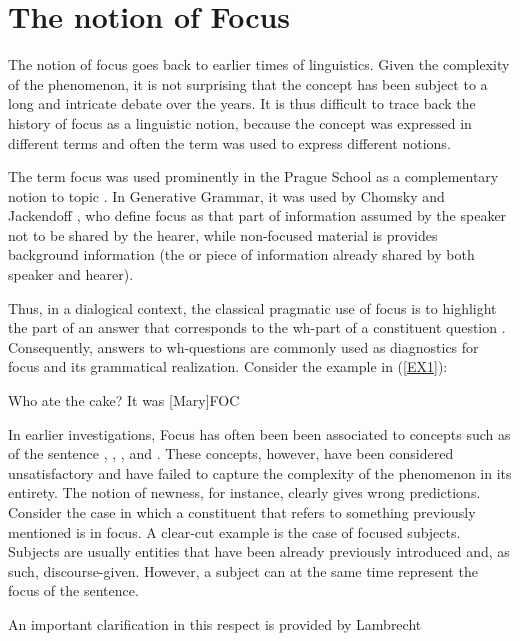 \documentclass[12pt]{report}
\begin{document}
\section{The notion of Focus} \label{notion}

The notion of focus goes back to earlier times of linguistics. Given the complexity of the phenomenon, it is not surprising that the concept has been subject to a long and intricate debate over the years. 
It is thus difficult to trace back the history of focus as a linguistic notion, because the concept was expressed in different terms and often the term was used to express different notions.

The term focus was used prominently in the Prague School as a complementary notion to topic \cite{sgall1986meaning}. In Generative Grammar, it was used by Chomsky \cite{chomsky1970some} and Jackendoff \cite{jackendoff1972semantic}, who define focus as that part of information assumed by the speaker not to be shared by the hearer, while non-focused material is provides background information (the  or piece of information already shared by both speaker and hearer). 

Thus, in a dialogical context, the classical pragmatic use of focus is to highlight the part of an answer that corresponds to the wh-part of a constituent question \cite{paul2010prinzipien}. Consequently, answers to wh-questions are commonly used as diagnostics for focus and its grammatical realization. Consider the example in (\ref{EX1}):


\pex \label{EX1}
\a Who ate the cake? 
\a It was [Mary]\tiny{FOC}
\xe

\noindent
In earlier investigations, Focus has often been been associated to concepts such as  of the sentence \cite{bolinger1985two}, , ,  and  \cite{halliday_1967}. These concepts, however, have been considered unsatisfactory and have failed to capture the complexity of the phenomenon in its entirety. The notion of newness, for instance, clearly gives wrong predictions. Consider the case in which a constituent that refers to something previously mentioned is in focus. A clear-cut example is the case of focused subjects. Subjects are usually entities that have been already previously introduced and, as such, discourse-given. However, a subject can at the same time represent the focus of the sentence.


An important clarification in this respect is provided by Lambrecht 
\end{document}
